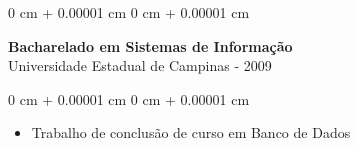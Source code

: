 \documentclass[10pt, letterpaper]{article}
\newenvironment{highlights}{
    \begin{itemize}[
        topsep=0.10 cm,
        parsep=0.10 cm,
        partopsep=0pt,
        itemsep=0pt,
        leftmargin=0 cm + 10pt
    ]
}{
    \end{itemize}
}
\newenvironment{onecolentry}{
    \begin{adjustwidth}{
        0 cm + 0.00001 cm
    }{
        0 cm + 0.00001 cm
    }
}{
    \end{adjustwidth}
}
\begin{document}
\vspace{0.2cm}

\begin{onecolentry}
    \setcolumnwidth{\fill, 4.5cm}
    \begin{paracol}{2}
        \textbf{Bacharelado em Sistemas de Informação} \\ Universidade Estadual de Campinas
        \switchcolumn
         - 2009
    \end{paracol}
\end{onecolentry}
\vspace{0.10cm}
\begin{onecolentry}
    \begin{highlights}
                \item Trabalho de conclusão de curso em Banco de Dados
    \end{highlights}
\end{onecolentry}
\end{document}
